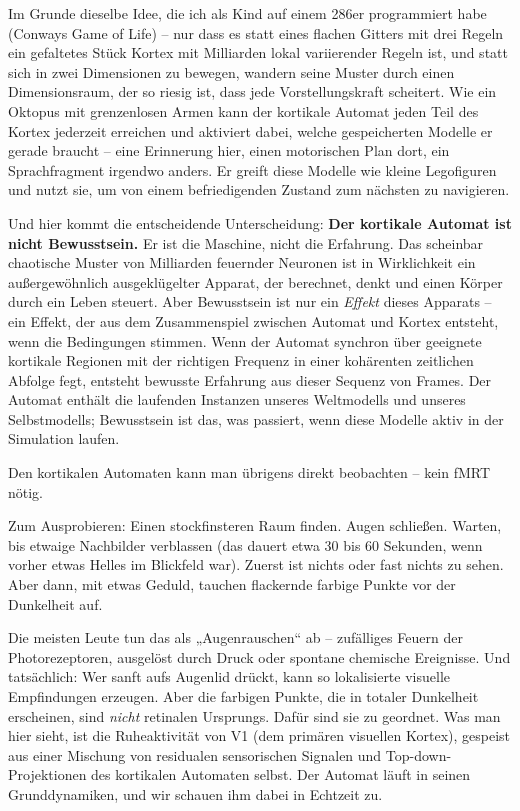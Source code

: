 \documentclass[11pt, twoside, openright]{book}
\begin{document}
Im Grunde dieselbe Idee, die ich als Kind auf einem 286er programmiert habe (Conways Game of Life) -- nur dass es statt eines flachen Gitters mit drei Regeln ein gefaltetes Stück Kortex mit Milliarden lokal variierender Regeln ist, und statt sich in zwei Dimensionen zu bewegen, wandern seine Muster durch einen Dimensionsraum, der so riesig ist, dass jede Vorstellungskraft scheitert. Wie ein Oktopus mit grenzenlosen Armen kann der kortikale Automat jeden Teil des Kortex jederzeit erreichen und aktiviert dabei, welche gespeicherten Modelle er gerade braucht -- eine Erinnerung hier, einen motorischen Plan dort, ein Sprachfragment irgendwo anders. Er greift diese Modelle wie kleine Legofiguren und nutzt sie, um von einem befriedigenden Zustand zum nächsten zu navigieren.

Und hier kommt die entscheidende Unterscheidung: \textbf{Der kortikale Automat ist nicht Bewusstsein.} Er ist die Maschine, nicht die Erfahrung. Das scheinbar chaotische Muster von Milliarden feuernder Neuronen ist in Wirklichkeit ein außergewöhnlich ausgeklügelter Apparat, der berechnet, denkt und einen Körper durch ein Leben steuert. Aber Bewusstsein ist nur ein \textit{Effekt} dieses Apparats -- ein Effekt, der aus dem Zusammenspiel zwischen Automat und Kortex entsteht, wenn die Bedingungen stimmen. Wenn der Automat synchron über geeignete kortikale Regionen mit der richtigen Frequenz in einer kohärenten zeitlichen Abfolge fegt, entsteht bewusste Erfahrung aus dieser Sequenz von Frames. Der Automat enthält die laufenden Instanzen unseres Weltmodells und unseres Selbstmodells; Bewusstsein ist das, was passiert, wenn diese Modelle aktiv in der Simulation laufen.

Den kortikalen Automaten kann man übrigens direkt beobachten -- kein fMRT nötig.

Zum Ausprobieren: Einen stockfinsteren Raum finden. Augen schließen. Warten, bis etwaige Nachbilder verblassen (das dauert etwa 30 bis 60 Sekunden, wenn vorher etwas Helles im Blickfeld war). Zuerst ist nichts oder fast nichts zu sehen. Aber dann, mit etwas Geduld, tauchen flackernde farbige Punkte vor der Dunkelheit auf.

Die meisten Leute tun das als „Augenrauschen“ ab -- zufälliges Feuern der Photorezeptoren, ausgelöst durch Druck oder spontane chemische Ereignisse. Und tatsächlich: Wer sanft aufs Augenlid drückt, kann so lokalisierte visuelle Empfindungen erzeugen. Aber die farbigen Punkte, die in totaler Dunkelheit erscheinen, sind \textit{nicht} retinalen Ursprungs. Dafür sind sie zu geordnet. Was man hier sieht, ist die Ruheaktivität von V1 (dem primären visuellen Kortex), gespeist aus einer Mischung von residualen sensorischen Signalen und Top-down-Projektionen des kortikalen Automaten selbst. Der Automat läuft in seinen Grunddynamiken, und wir schauen ihm dabei in Echtzeit zu.
\end{document}
